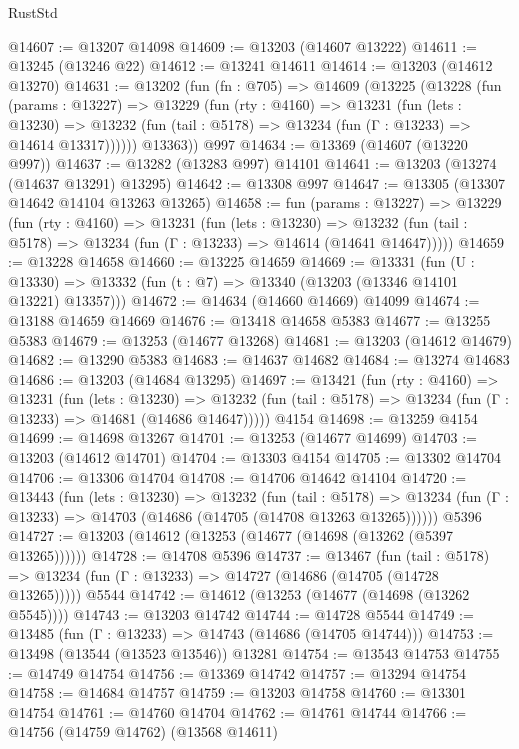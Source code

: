 \begin{lexlean}{RustStd}
\begin{coremodule}
@14607 := @13207 @14098
@14609 := @13203 (@14607 @13222)
@14611 := @13245 (@13246 @22)
@14612 := @13241 @14611
@14614 := @13203 (@14612 @13270)
@14631 := @13202
    (fun (fn : @705) =>
    @14609
      (@13225
        (@13228
          (fun (params : @13227) =>
          @13229
            (fun (rty : @4160) =>
            @13231
              (fun (lets : @13230) =>
              @13232 (fun (tail : @5178) => @13234 (fun (Γ : @13233) => @14614 @13317))))))
        @13363))
    @997
@14634 := @13369 (@14607 (@13220 @997))
@14637 := @13282 (@13283 @997) @14101
@14641 := @13203 (@13274 (@14637 @13291) @13295)
@14642 := @13308 @997
@14647 := @13305 (@13307 @14642 @14104 @13263 @13265)
@14658 := fun (params : @13227) =>
  @13229
    (fun (rty : @4160) =>
    @13231
      (fun (lets : @13230) =>
      @13232 (fun (tail : @5178) => @13234 (fun (Γ : @13233) => @14614 (@14641 @14647)))))
@14659 := @13228 @14658
@14660 := @13225 @14659
@14669 := @13331
    (fun (U : @13330) => @13332 (fun (t : @7) => @13340 (@13203 (@13346 @14101 @13221) @13357)))
@14672 := @14634 (@14660 @14669) @14099
@14674 := @13188 @14659 @14669
@14676 := @13418 @14658 @5383
@14677 := @13255 @5383
@14679 := @13253 (@14677 @13268)
@14681 := @13203 (@14612 @14679)
@14682 := @13290 @5383
@14683 := @14637 @14682
@14684 := @13274 @14683
@14686 := @13203 (@14684 @13295)
@14697 := @13421
    (fun (rty : @4160) =>
    @13231
      (fun (lets : @13230) =>
      @13232 (fun (tail : @5178) => @13234 (fun (Γ : @13233) => @14681 (@14686 @14647)))))
    @4154
@14698 := @13259 @4154
@14699 := @14698 @13267
@14701 := @13253 (@14677 @14699)
@14703 := @13203 (@14612 @14701)
@14704 := @13303 @4154
@14705 := @13302 @14704
@14706 := @13306 @14704
@14708 := @14706 @14642 @14104
@14720 := @13443
    (fun (lets : @13230) =>
    @13232
      (fun (tail : @5178) =>
      @13234 (fun (Γ : @13233) => @14703 (@14686 (@14705 (@14708 @13263 @13265))))))
    @5396
@14727 := @13203 (@14612 (@13253 (@14677 (@14698 (@13262 (@5397 @13265))))))
@14728 := @14708 @5396
@14737 := @13467
    (fun (tail : @5178) => @13234 (fun (Γ : @13233) => @14727 (@14686 (@14705 (@14728 @13265)))))
    @5544
@14742 := @14612 (@13253 (@14677 (@14698 (@13262 @5545))))
@14743 := @13203 @14742
@14744 := @14728 @5544
@14749 := @13485 (fun (Γ : @13233) => @14743 (@14686 (@14705 @14744)))
@14753 := @13498 (@13544 (@13523 @13546)) @13281
@14754 := @13543 @14753
@14755 := @14749 @14754
@14756 := @13369 @14742
@14757 := @13294 @14754
@14758 := @14684 @14757
@14759 := @13203 @14758
@14760 := @13301 @14754
@14761 := @14760 @14704
@14762 := @14761 @14744
@14766 := @14756 (@14759 @14762) (@13568 @14611)

\end{coremodule}
\end{lexlean}
